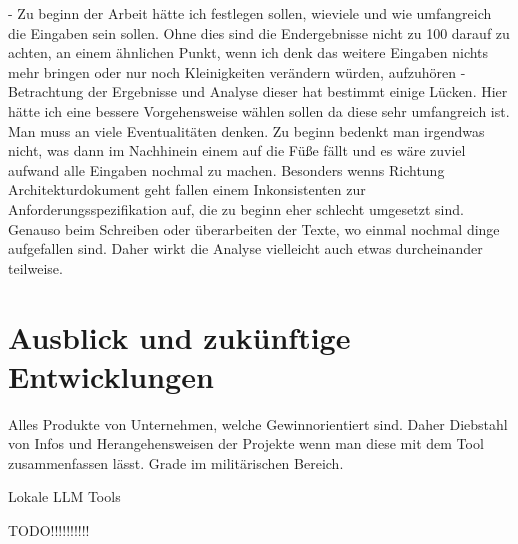 - Zu beginn der Arbeit hätte ich festlegen sollen, wieviele und wie umfangreich die Eingaben sein sollen. Ohne dies sind die 
Endergebnisse nicht zu 100%
darauf zu achten, an einem ähnlichen Punkt, wenn ich denk das weitere Eingaben nichts mehr bringen oder nur noch Kleinigkeiten 
verändern würden, aufzuhören
- Betrachtung der Ergebnisse und Analyse dieser hat bestimmt einige Lücken. Hier hätte ich eine bessere Vorgehensweise wählen sollen
da diese sehr umfangreich ist. Man muss an viele Eventualitäten denken. Zu beginn bedenkt man irgendwas nicht, was dann im Nachhinein 
einem auf die Füße fällt und es wäre zuviel aufwand alle Eingaben nochmal zu machen. Besonders wenns Richtung Architekturdokument geht 
fallen einem Inkonsistenten zur Anforderungsspezifikation auf, die zu beginn eher schlecht umgesetzt sind. Genauso beim Schreiben oder überarbeiten der 
Texte, wo einmal nochmal dinge aufgefallen sind. Daher wirkt die Analyse vielleicht auch etwas durcheinander teilweise. 


\section{Ausblick und zukünftige Entwicklungen}  \label{Ausblick und zukünftige Entwicklungen}



Alles Produkte von Unternehmen, welche Gewinnorientiert sind. Daher Diebstahl von Infos und Herangehensweisen der Projekte 
wenn man diese mit dem Tool zusammenfassen lässt. Grade im militärischen Bereich.

Lokale LLM Tools

TODO!!!!!!!!!!
